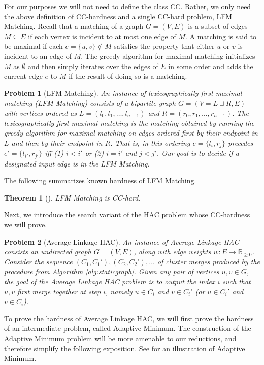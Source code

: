 \documentclass[11pt]{article}
\newcommand{\am}{\textsf{Adaptive Minimum}\xspace}
\newcommand{\hac}{\textsf{Average Linkage HAC}\xspace}
\newcommand{\lfm}{\textsf{LFM Matching}\xspace}
\newcommand{\CC}{\textsc{CC}\xspace}
\newtheorem{problem}{Problem}
\newtheorem{theorem}{Theorem}
\begin{document}
For our purposes we will not need to define the class \CC. Rather, we only need the above definition of \CC-hardness and a single \CC-hard problem, \lfm. Recall that a matching of a graph $G = (V, E)$ is a subset of edges $M \subseteq E$ if each vertex is incident to at most one edge of $M$. A matching is said to be maximal if each $e = \{u, v\} \not \in M$ satisfies the property that either $u$ or $v$ is incident to an edge of $M$. The greedy algorithm for maximal matching initializes $M$ as $\emptyset$ and then simply iterates over the edges of $E$ in some order and adds the current edge $e$ to $M$ if the result of doing so is a matching.

\begin{problem}[\lfm]\label{dfn:LFMM} An instance of lexicographically first maximal matching (LFM Matching) consists of a bipartite graph $G=(V = L \sqcup R, E)$ with vertices ordered as $L = (l_0, l_1, \ldots, l_{n-1})$ and $R = (r_0, r_1, \ldots, r_{n-1})$. The lexicographically first maximal matching is the matching obtained by running the greedy algorithm for maximal matching on edges ordered first by their endpoint in $L$ and then by their endpoint in $R$. That is, in this ordering $e = \{l_i, r_j\}$ precedes $e' = \{l_{i'}, r_{j'}\}$ iff (1) $i < i'$ or (2) $i = i'$ and $j < j'$. Our goal is to decide if a designated input edge is in the LFM Matching.
\end{problem}
The following summarizes known hardness of \lfm.
\begin{theorem}[\cite{subramanian1989new,mayr1992complexity}]\label{thm:LFMCCComplete}
    \lfm is \CC-hard.
\end{theorem}

Next, we introduce the search variant of the HAC problem whose \CC-hardness we will prove. 

\begin{problem}[\hac]\label{prob:hac}
An instance of \hac consists an undirected graph $G = (V,E)$, along with edge weights $w:E \to \mathbb{R}_{\geq 0}$. Consider the sequence $(C_1,C_1'),(C_2,C_2'),\dots$ of cluster merges produced by the procedure  from Algorithm \ref{alg:staticgraph}. Given any pair of vertices $u,v \in G$, the goal of the \hac problem is to output the index $i$ such that $u,v$ first merge together at step $i$, namely $u \in C_i$ and $v \in C_i'$ (or $u \in C_i'$ and $v \in C_i$). 
\end{problem}

To prove the hardness of \hac, we will first prove the hardness of an intermediate problem, called \am. The construction of the \am problem will be more amenable to our reductions, and therefore simplify the following exposition. See  for an illustration of \am.
\end{document}
